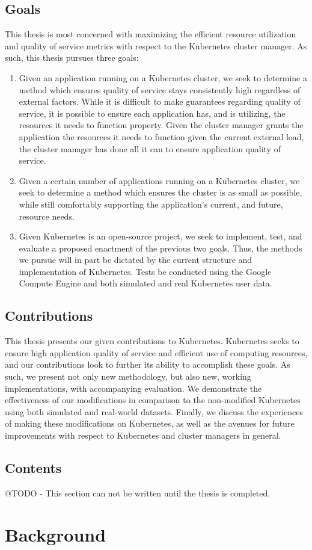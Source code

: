 \documentclass[twoside]{report}
\begin{document}
\section{Goals}

This thesis is most concerned with maximizing the efficient resource utilization
and quality of service metrics with respect to the Kubernetes cluster manager.
As such, this thesis pursues three goals:

\begin{enumerate}
  \item Given an application running on a Kubernetes cluster, we seek to
    determine a method which ensures quality of
    service stays consistently high regardless of external factors. While it is
    difficult to make guarantees regarding quality of service, it is possible to
    ensure each application has, and is utilizing, the resources it needs to
    function property. Given the cluster manager grants the application the
    resources it needs to function given the current external load,
    the cluster manager has done all it can to ensure application quality of
    service.
  \item Given a certain number of applications running on a Kubernetes cluster,
    we seek to determine a method which ensures the cluster is
    as small as possible, while still comfortably
    supporting the application's current, and future, resource needs.
  \item Given Kubernetes is an open-source project, we seek to implement, test, and
    evaluate a proposed enactment of the previous two goals.
    Thus, the methods we pursue will
    in part be dictated by the current structure and implementation of
    Kubernetes. Tests be conducted using the Google Compute
    Engine\cite{google-compute-engine} and both
    simulated and real Kubernetes user data.
\end{enumerate}

\section{Contributions}

This thesis presents our given contributions to Kubernetes. Kubernetes seeks to
ensure high application quality of service and efficient use of computing
resources, and our contributions look to further its ability to accomplish these
goals. As such, we present not only new methodology, but also new, working
implementations, with accompanying evaluation. We demonstrate the effectiveness
of our modifications in comparison to the non-modified Kubernetes using both
simulated and real-world datasets. Finally, we
discuss the experiences of making these modifications on Kubernetes, as well as
the avenues for future improvements with respect to Kubernetes and cluster managers in
general.

\section{Contents}

@TODO - This section can not be written until the thesis is completed.

\chapter{Background}



\end{document}
